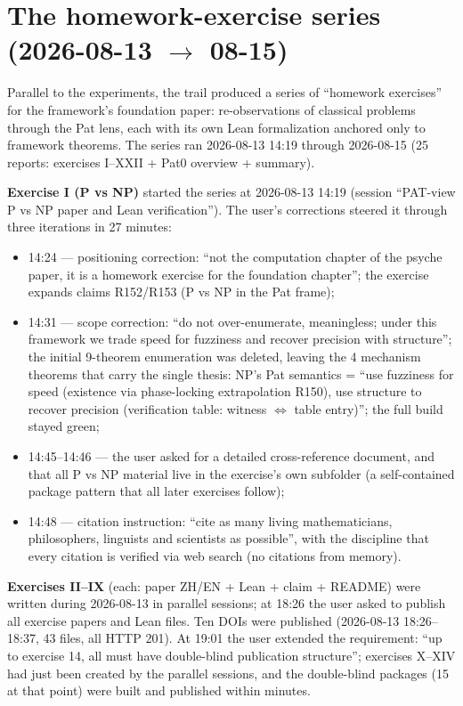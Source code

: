 \documentclass[sigplan,10pt,anonymous,review]{acmart}
\begin{document}
\section{The homework-exercise series (2026-08-13 $\to$ 08-15)}

Parallel to the experiments, the trail produced a series of ``homework
exercises'' for the framework's foundation paper: re-observations of classical
problems through the Pat lens, each with its own Lean formalization anchored
only to framework theorems. The series ran 2026-08-13 14:19 through
2026-08-15 (25 reports: exercises I--XXII + Pat0 overview + summary).

\textbf{Exercise I (P vs NP)} started the series at 2026-08-13 14:19 (session
``PAT-view P vs NP paper and Lean verification''). The user's corrections
steered it through three iterations in 27 minutes:
\begin{itemize}
\item 14:24 --- positioning correction: ``not the computation chapter of the
  psyche paper, it is a homework exercise for the foundation chapter''; the
  exercise expands claims R152/R153 (P vs NP in the Pat frame);
\item 14:31 --- scope correction: ``do not over-enumerate, meaningless; under
  this framework we trade speed for fuzziness and recover precision with
  structure''; the initial 9-theorem enumeration was deleted, leaving the 4
  mechanism theorems that carry the single thesis: NP's Pat semantics = ``use
  fuzziness for speed (existence via phase-locking extrapolation R150), use
  structure to recover precision (verification table: witness $\iff$ table
  entry)''; the full build stayed green;
\item 14:45--14:46 --- the user asked for a detailed cross-reference document,
  and that all P vs NP material live in the exercise's own subfolder
  (a self-contained package pattern that all later exercises follow);
\item 14:48 --- citation instruction: ``cite as many living mathematicians,
  philosophers, linguists and scientists as possible'', with the discipline
  that every citation is verified via web search (no citations from memory).
\end{itemize}

\textbf{Exercises II--IX} (each: paper ZH/EN + Lean + claim + README) were
written during 2026-08-13 in parallel sessions; at 18:26 the user asked to
publish all exercise papers and Lean files. Ten DOIs were published
(2026-08-13 18:26--18:37, 43 files, all HTTP 201). At 19:01 the user
extended the requirement: ``up to exercise 14, all must have double-blind
publication structure''; exercises X--XIV had just been created by the
parallel sessions, and the double-blind packages (15 at that point) were
built and published within minutes.
\end{document}
